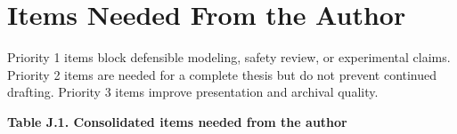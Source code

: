 \chapter{Items Needed From the Author}\label{ch:items-needed-from-the-author}

Priority 1 items block defensible modeling, safety review, or
experimental claims. Priority 2 items are needed for a complete thesis
but do not prevent continued drafting. Priority 3 items improve
presentation and archival quality.

\clearpage
\begin{landscape}
\par\medskip\noindent\singlespacing
{}
\textbf{Table J.1. Consolidated items needed from the author}\par


\end{landscape}
